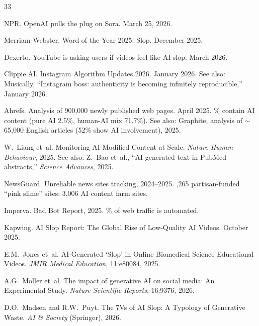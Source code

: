 \documentclass[12pt]{article}
\begin{document}
\begin{thebibliography}{33}

NPR.
\newblock OpenAI pulls the plug on Sora.
\newblock March 25, 2026.

Merriam-Webster.
\newblock Word of the Year 2025: Slop.
\newblock December 2025.

Dexerto.
\newblock YouTube is asking users if videos feel like AI slop.
\newblock March 2026.

Clippie.AI.
\newblock Instagram Algorithm Updates 2026.
\newblock January 2026.
\newblock See also: Musically, ``Instagram boss: authenticity is becoming infinitely reproducible,'' January 2026.

Ahrefs.
\newblock Analysis of 900,000 newly published web pages.
\newblock April 2025.
\% contain AI content (pure AI 2.5\%, human-AI mix 71.7\%).
\newblock See also: Graphite, analysis of ${\sim}$65,000 English articles (52\% show AI involvement), 2025.

W.~Liang et~al.
\newblock Monitoring AI-Modified Content at Scale.
\newblock \emph{Nature Human Behaviour}, 2025.
\newblock See also: Z.~Bao et~al., ``AI-generated text in PubMed abstracts,'' \emph{Science Advances}, 2025.

NewsGuard.
\newblock Unreliable news sites tracking, 2024--2025.
,265 partisan-funded ``pink slime'' sites; 3,006 AI content farm sites.

Imperva.
 Bad Bot Report, 2025.
\% of web traffic is automated.

Kapwing.
\newblock AI Slop Report: The Global Rise of Low-Quality AI Videos.
\newblock October 2025.

E.M.~Jones et~al.
\newblock AI-Generated `Slop' in Online Biomedical Science Educational Videos.
\newblock \emph{JMIR Medical Education}, 11:e80084, 2025.

A.G.~Moller et~al.
\newblock The impact of generative AI on social media: An Experimental Study.
\newblock \emph{Nature Scientific Reports}, 16:9376, 2026.

D.O.~Madsen and R.W.~Puyt.
\newblock The 7Vs of AI Slop: A Typology of Generative Waste.
\newblock \emph{AI \& Society} (Springer), 2026.


\end{thebibliography}
\end{document}
